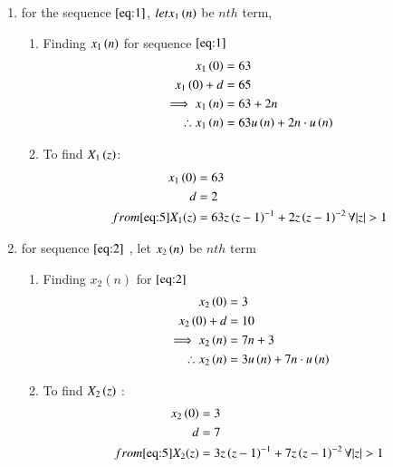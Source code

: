 \documentclass[journal,12pt,twocolumn]{IEEEtran}
\theoremstyle{remark}
\begin{document}
\begin{enumerate}
\item
for the sequence $ \eqref{eq:1}$, $ let x_1\left(n\right)$  be $ nth$ term, 
\begin{enumerate}
\item
Finding $ x_1\left(n\right)$ for sequence $ \eqref{eq:1}$
\begin{align}
x_1\left(0\right) &= 63\\
x_1\left(0\right)+d &= 65\\
\implies x_1\left(n\right) &= 63 + 2n \label{eq:3}\\
\therefore x_1\left(n\right) &= 63u\left(n\right) + 2n\cdot u\left(n\right)
\end{align}
\item
To find $ X_1\left(z\right)$:
\begin{align}
x_1\brak{0}&=63\\
d &= 2\\
from \eqref{eq:5} X_1(z) &= 63z\brak{z-1}^{-1} + 2z\brak{z-1}^{-2}  \forall  |z|>1
\end{align}
\end{enumerate}
\item
for sequence $ \eqref{eq:2}$ , let $ x_2\left(n\right)$ be $ nth$ term\\
\begin{enumerate}
\item 
Finding $ x_2(n)$ for $ \eqref{eq:2}$
\begin{align}
x_2\left(0\right) &= 3 \\
x_2\left(0\right)+d &= 10\\
\implies x_2\left(n\right) &= 7n + 3 \label{eq:4}\\
\therefore x_2\left(n\right) &= 3u\left(n\right) + 7n\cdot u\left(n\right) \label{eq:4}
\end{align}
\item
To find $ X_2\left(z\right)$ :\\
\begin{align}
x_2\brak{0}&=3\\
d &= 7\\
from \eqref{eq:5} X_2(z) &= 3z\brak{z-1}^{-1} + 7z\brak{z-1}^{-2}  \forall  |z|>1
\end{align}


\end{enumerate}
\end{enumerate}
\end{document}
